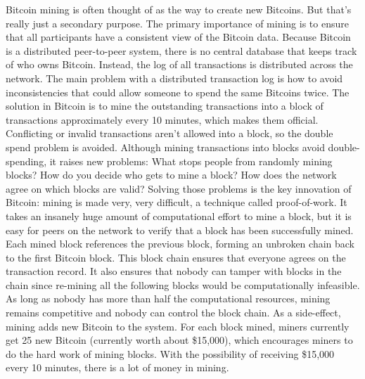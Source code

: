 Bitcoin mining is often thought of as the way to create new Bitcoins. But that's really just a secondary purpose. The primary importance of mining is to ensure that all participants have a consistent view of the Bitcoin data. Because Bitcoin is a distributed peer-to-peer system, there is no central database that keeps track of who owns Bitcoin. Instead, the log of all transactions is distributed across the network.
The main problem with a distributed transaction log is how to avoid inconsistencies that could allow someone to spend the same Bitcoins twice. The solution in Bitcoin is to mine the outstanding transactions into a block of transactions approximately every 10 minutes, which makes them official. Conflicting or invalid transactions aren't allowed into a block, so the double spend problem is avoided\cite{kaplanov2012nerdy}.
Although mining transactions into blocks avoid double-spending, it raises new problems: What stops people from randomly mining blocks? How do you decide who gets to mine a block? How does the network agree on which blocks are valid? Solving those problems is the key innovation of Bitcoin: mining is made very, very difficult, a technique called proof-of-work. It takes an insanely huge amount of computational effort to mine a block, but it is easy for peers on the network to verify that a block has been successfully mined. 
Each mined block references the previous block, forming an unbroken chain back to the first Bitcoin block. This block chain ensures that everyone agrees on the transaction record. It also ensures that nobody can tamper with blocks in the chain since re-mining all the following blocks would be computationally infeasible. As long as nobody has more than half the computational resources, mining remains competitive and nobody can control the block chain.
As a side-effect, mining adds new Bitcoin to the system. For each block mined, miners currently get 25 new Bitcoin (currently worth about \$15,000), which encourages miners to do the hard work of mining blocks. With the possibility of receiving \$15,000 every 10 minutes, there is a lot of money in mining.

